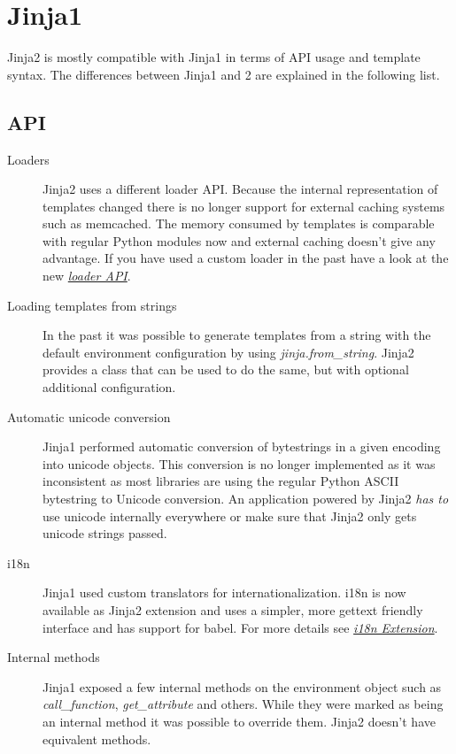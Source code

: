 \documentclass[a4paper,10pt,english]{sphinxmanual}
\begin{document}
\section{Jinja1}
\label{switching:jinja1}
Jinja2 is mostly compatible with Jinja1 in terms of API usage and template
syntax.  The differences between Jinja1 and 2 are explained in the following
list.


\subsection{API}
\label{switching:api}\begin{description}
\item[{Loaders}] \leavevmode
Jinja2 uses a different loader API.  Because the internal representation
of templates changed there is no longer support for external caching
systems such as memcached.  The memory consumed by templates is comparable
with regular Python modules now and external caching doesn't give any
advantage.  If you have used a custom loader in the past have a look at
the new {\hyperref[api:loaders]{\emph{loader API}}}.

\item[{Loading templates from strings}] \leavevmode
In the past it was possible to generate templates from a string with the
default environment configuration by using \emph{jinja.from\_string}.  Jinja2
provides a  class that can be used to do the same, but
with optional additional configuration.

\item[{Automatic unicode conversion}] \leavevmode
Jinja1 performed automatic conversion of bytestrings in a given encoding
into unicode objects.  This conversion is no longer implemented as it
was inconsistent as most libraries are using the regular Python ASCII
bytestring to Unicode conversion.  An application powered by Jinja2
\emph{has to} use unicode internally everywhere or make sure that Jinja2 only
gets unicode strings passed.

\item[{i18n}] \leavevmode
Jinja1 used custom translators for internationalization.  i18n is now
available as Jinja2 extension and uses a simpler, more gettext friendly
interface and has support for babel.  For more details see
{\hyperref[extensions:i18n-extension]{\emph{i18n Extension}}}.

\item[{Internal methods}] \leavevmode
Jinja1 exposed a few internal methods on the environment object such
as \emph{call\_function}, \emph{get\_attribute} and others.  While they were marked
as being an internal method it was possible to override them.  Jinja2
doesn't have equivalent methods.


\end{description}
\end{document}
